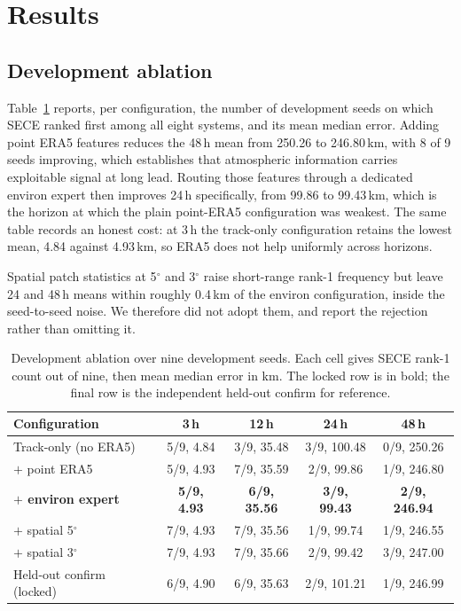 \documentclass[conference]{IEEEtran}
\newcommand{\sece}{SECE}
\newcommand{\era}{ERA5}
\begin{document}
\section{Results}
\subsection{Development ablation}
\label{sec:abl}
Table~\ref{tab:abl} reports, per configuration, the number of development seeds
on which \sece{} ranked first among all eight systems, and its mean median error.
Adding point \era{} features reduces the 48\,h mean from 250.26 to 246.80\,km,
with 8 of 9 seeds improving, which establishes that atmospheric information
carries exploitable signal at long lead. Routing those features through a
dedicated environ expert then improves 24\,h specifically, from 99.86 to
99.43\,km, which is the horizon at which the plain point-\era{} configuration was
weakest. The same table records an honest cost: at 3\,h the track-only
configuration retains the lowest mean, 4.84 against 4.93\,km, so \era{} does not
help uniformly across horizons.

Spatial patch statistics at 5$^\circ$ and 3$^\circ$ raise short-range rank-1
frequency but leave 24 and 48\,h means within roughly 0.4\,km of the environ
configuration, inside the seed-to-seed noise. We therefore did not adopt them,
and report the rejection rather than omitting it.

\begin{table}[!t]
\caption{Development ablation over nine development seeds. Each cell gives
\sece{} rank-1 count out of nine, then mean median error in km. The locked row is
in bold; the final row is the independent held-out confirm for reference.}
\label{tab:abl}
\centering
\footnotesize
\setlength{\tabcolsep}{3.5pt}
\begin{tabular}{@{}lcccc@{}}
\toprule
Configuration & 3\,h & 12\,h & 24\,h & 48\,h \\
\midrule
Track-only (no \era{})      & 5/9, 4.84 & 3/9, 35.48 & 3/9, 100.48 & 0/9, 250.26 \\
$+$ point \era{}            & 5/9, 4.93 & 7/9, 35.59 & 2/9, \phantom{0}99.86 & 1/9, 246.80 \\
\textbf{$+$ environ expert} & \textbf{5/9, 4.93} & \textbf{6/9, 35.56} & \textbf{3/9, \phantom{0}99.43} & \textbf{2/9, 246.94} \\
$+$ spatial 5$^\circ$       & 7/9, 4.93 & 7/9, 35.56 & 1/9, \phantom{0}99.74 & 1/9, 246.55 \\
$+$ spatial 3$^\circ$       & 7/9, 4.93 & 7/9, 35.66 & 2/9, \phantom{0}99.42 & 3/9, 247.00 \\
\midrule
Held-out confirm (locked)   & 6/9, 4.90 & 6/9, 35.63 & 2/9, 101.21 & 1/9, 246.99 \\
\bottomrule
\end{tabular}
\end{table}
\end{document}
